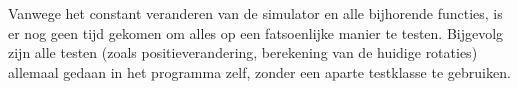 \\
\\
Vanwege het constant veranderen van de simulator en alle bijhorende functies, is er nog geen tijd gekomen om alles op een fatsoenlijke manier te testen. Bijgevolg zijn alle testen (zoals positieverandering, berekening van de huidige rotaties) allemaal gedaan in het programma zelf, zonder een aparte testklasse te gebruiken. \\

